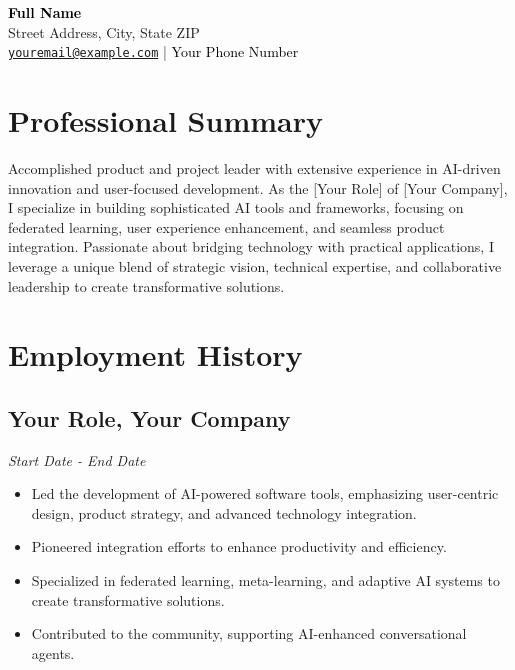 \documentclass[a4paper,10pt]{article}
\newcommand{\daterange}[1]{\textit{\textcolor{mybronze}{#1}}}
\begin{document}
\begin{center}
    {\LARGE \textbf{\textcolor{black}{Full Name}}} \\[0.3cm]
    \textcolor{mysecondary}{Street Address, City, State ZIP} \\[0.1cm]
    \href{mailto:youremail@example.com}{\texttt{\textcolor{myblue}{youremail@example.com}}} 
    \textcolor{mybronze}{|} 
    \textcolor{black}{Your Phone Number}
\end{center}

\vspace{0.1cm}

\section*{Professional Summary}
\textcolor{mysecondary}{
Accomplished product and project leader with extensive experience in AI-driven innovation and user-focused development. As the [Your Role] of [Your Company], I specialize in building sophisticated AI tools and frameworks, focusing on federated learning, user experience enhancement, and seamless product integration. Passionate about bridging technology with practical applications, I leverage a unique blend of strategic vision, technical expertise, and collaborative leadership to create transformative solutions.
}

\section*{Employment History}

\subsection*{Your Role, Your Company}
\daterange{Start Date - End Date}
\begin{itemize}
    \item Led the development of AI-powered software tools, emphasizing user-centric design, product strategy, and advanced technology integration.
    \item Pioneered integration efforts to enhance productivity and efficiency.
    \item Specialized in federated learning, meta-learning, and adaptive AI systems to create transformative solutions.
    \item Contributed to the community, supporting AI-enhanced conversational agents.
\end{itemize}
\end{document}
